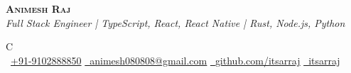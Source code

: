 \documentclass[a4paper,11pt]{article}
\begin{document}



\begin{center}
    \textbf{\Huge \scshape Animesh Raj} \\[0.4em]
    \textit{Full Stack Engineer | TypeScript, React, React Native | Rust, Node.js, Python} \\[0.4em]
    \small
    \begin{tabularx}{\linewidth}{C} \\
        {\raisebox{0.0\height}{\footnotesize \faPhone}\ \underline{+91-9102888850}} \hspace{4pt}
        \href{mailto:animesh080808@gmail.com}{\raisebox{0.0\height}{\footnotesize \faEnvelope}\ \underline{animesh080808@gmail.com}} \hspace{4pt}
        \href{https://github.com/itsarraj}{\raisebox{0.0\height}{\footnotesize \faGithub}\ \underline{github.com/itsarraj}} \hspace{4pt}
        \href{https://linkedin.com/in/itsarraj}{\raisebox{0.0\height}{\footnotesize \faLinkedin}\ \underline{itsarraj}} \hspace{4pt}
    \end{tabularx}
\end{center}

\vspace{-16pt}
\end{document}
